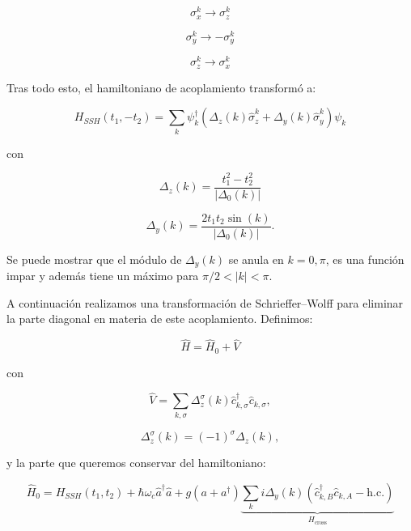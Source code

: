 \documentclass[11pt]{article}
\begin{document}
\begin{equation}
\sigma_x^k \rightarrow \sigma_z^k
\end{equation}

\begin{equation}
\sigma_y^k \rightarrow -\sigma_y^k
\end{equation}

\begin{equation}
\sigma_z^k \rightarrow \sigma_x^k
\end{equation}

Tras todo esto, el hamiltoniano de acoplamiento transformó a:

\begin{equation}
H_{SSH}(t_1,-t_2)
=
\sum_k
\psi_k^\dagger
\left(
\Delta_z(k)\hat{\sigma}_z^k
+
\Delta_y(k)\hat{\sigma}_y^k
\right)
\psi_k
\end{equation}

con

\begin{equation}
\Delta_z(k)
=
\frac{
t_1^2 - t_2^2
}{
|\Delta_0(k)|
}
\end{equation}

\begin{equation}
\Delta_y(k)
=
\frac{
2t_1 t_2 \sin(k)
}{
|\Delta_0(k)|
}.
\end{equation}

Se puede mostrar que el módulo de $\Delta_y(k)$ se anula en
$k = 0,\pi$, es una función impar y además tiene un máximo para
$\pi/2 < |k| < \pi$.

A continuación realizamos una transformación de Schrieffer--Wolff
para eliminar la parte diagonal en materia de este acoplamiento.
Definimos:

\begin{equation}
\hat{H} = \hat{H}_0 + \hat{V}
\end{equation}

con

\begin{equation}
\hat{V}
=
\sum_{k,\sigma}
\Delta_z^\sigma(k)
\hat{c}_{k,\sigma}^\dagger
\hat{c}_{k,\sigma},
\end{equation}

\begin{equation}
\Delta_z^\sigma(k)
=
(-1)^\sigma \Delta_z(k),
\end{equation}

y la parte que queremos conservar del hamiltoniano:

\begin{equation}
\hat{H}_0
=
H_{SSH}(t_1,t_2)
+
\hbar\omega_c \hat{a}^\dagger \hat{a}
+
g(a+a^\dagger)
\underbrace{
\sum_k
i\Delta_y(k)
\left(
\hat{c}_{k,B}^\dagger \hat{c}_{k,A}
-
\mathrm{h.c.}
\right)
}_{H_{\mathrm{cross}}}
\end{equation}
\end{document}
